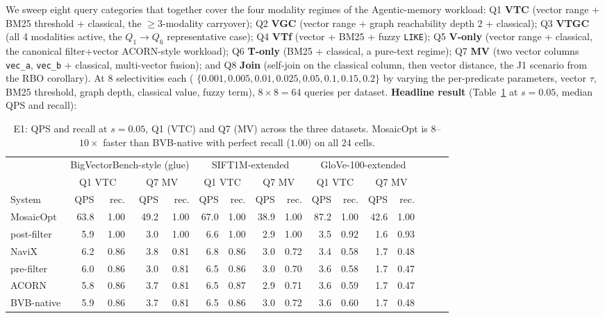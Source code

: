 \documentclass[sigconf]{acmart}
\theoremstyle{plain}
\theoremstyle{definition}
\theoremstyle{remark}
\begin{document}
We sweep eight query categories that together cover the four
modality regimes of the Agentic-memory workload:
Q1 \textbf{VTC} (vector range + BM25 threshold + classical, the
$\ge 3$-modality carryover);
Q2 \textbf{VGC} (vector range + graph reachability depth 2 +
classical);
Q3 \textbf{VTGC} (all 4 modalities active, the $Q_1 \to Q_6$
representative case);
Q4 \textbf{VTf} (vector + BM25 + fuzzy \texttt{LIKE});
Q5 \textbf{V-only} (vector range + classical, the canonical
filter+vector ACORN-style workload);
Q6 \textbf{T-only} (BM25 + classical, a pure-text regime);
Q7 \textbf{MV} (two vector columns \texttt{vec\_a}, \texttt{vec\_b}
+ classical, multi-vector fusion); and
Q8 \textbf{Join} (self-join on the classical column, then
vector distance, the J1 scenario from the RBO corollary). At
$8$ selectivities each
(
$\{0.001, 0.005, 0.01, 0.025, 0.05, 0.1, 0.15, 0.2\}$
by varying the per-predicate parameters, vector $\tau$, BM25
threshold, graph depth, classical value, fuzzy term), $8 \times 8 =
64$ queries per dataset. \textbf{Headline result}
(Table~\ref{tab:e1} at $s = 0.05$, median QPS and recall):

\begin{table}[t]
  \centering
  \small
  \begin{tabular}{l rrr rrr rrr rrr rrr}
    \toprule
    & \multicolumn{4}{c}{BigVectorBench-style (glue)} & \multicolumn{4}{c}{SIFT1M-extended} & \multicolumn{4}{c}{GloVe-100-extended} \\
    \cmidrule(lr){2-5} \cmidrule(lr){6-9} \cmidrule(lr){10-13}
    & \multicolumn{2}{c}{Q1 VTC} & \multicolumn{2}{c}{Q7 MV} & \multicolumn{2}{c}{Q1 VTC} & \multicolumn{2}{c}{Q7 MV} & \multicolumn{2}{c}{Q1 VTC} & \multicolumn{2}{c}{Q7 MV} \\
    \cmidrule(lr){2-3} \cmidrule(lr){4-5} \cmidrule(lr){6-7} \cmidrule(lr){8-9} \cmidrule(lr){10-11} \cmidrule(lr){12-13}
    System & QPS & rec. & QPS & rec. & QPS & rec. & QPS & rec. & QPS & rec. & QPS & rec. \\
    \midrule
    MosaicOpt       & 63.8 & 1.00 & 49.2 & 1.00 & 67.0 & 1.00 & 38.9 & 1.00 & 87.2 & 1.00 & 42.6 & 1.00 \\
    post-filter     &  5.9 & 1.00 &  3.0 & 1.00 &  6.6 & 1.00 &  2.9 & 1.00 &  3.5 & 0.92 &  1.6 & 0.93 \\
    NaviX           &  6.2 & 0.86 &  3.8 & 0.81 &  6.8 & 0.86 &  3.0 & 0.72 &  3.4 & 0.58 &  1.7 & 0.48 \\
    pre-filter      &  6.0 & 0.86 &  3.0 & 0.81 &  6.5 & 0.86 &  3.0 & 0.70 &  3.6 & 0.58 &  1.7 & 0.47 \\
    ACORN           &  5.8 & 0.86 &  3.7 & 0.81 &  6.5 & 0.87 &  2.9 & 0.71 &  3.6 & 0.59 &  1.7 & 0.47 \\
    BVB-native      &  5.9 & 0.86 &  3.7 & 0.81 &  6.5 & 0.86 &  3.0 & 0.72 &  3.6 & 0.60 &  1.7 & 0.48 \\
    \bottomrule
  \end{tabular}
  \caption{E1: QPS and recall at $s = 0.05$, Q1 (VTC) and Q7 (MV)
    across the three datasets. MosaicOpt is $8$--$10\times$ faster
    than BVB-native with perfect recall ($1.00$) on all 24 cells.}
  \label{tab:e1}
\end{table}
\end{document}
